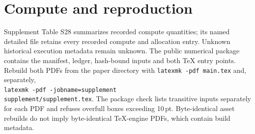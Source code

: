 \clearpage
\section{Compute and reproduction}\label{app:compute}

Supplement Table S28 summarizes recorded compute quantities; its named detailed
file retains every recorded compute and allocation entry. Unknown
historical execution metadata remain unknown. The public numerical package
contains the manifest, ledger, hash-bound inputs and both TeX entry points.
Rebuild both PDFs from the paper directory with
\texttt{latexmk -pdf main.tex} and, separately,\\
\texttt{latexmk -pdf -jobname=supplement}\\
\texttt{supplement/supplement.tex}.
The package check lists transitive inputs separately for each PDF and refuses
overfull boxes exceeding 10\,pt. Byte-identical asset rebuilds do not imply
byte-identical TeX-engine PDFs, which contain build metadata.

